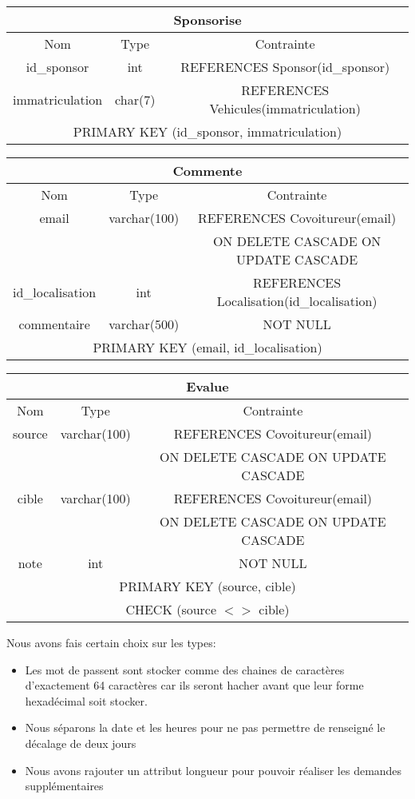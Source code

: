 \begin{center}
		\begin{tabular}{|c|c|c|}
			\hline
			\multicolumn{3}{|c|}{Sponsorise}\\
			\hline
			Nom & Type & Contrainte \\
			\hline
			id\_sponsor & int & REFERENCES Sponsor(id\_sponsor)\\\hline
			immatriculation & char(7) & REFERENCES Vehicules(immatriculation) \\\hline
			\multicolumn{3}{|c|}{PRIMARY KEY (id\_sponsor, immatriculation)}\\\hline
		\end{tabular}
		
		\begin{tabular}{|c|c|c|}
			\hline
			\multicolumn{3}{|c|}{Commente}\\
			\hline
			Nom & Type & Contrainte \\
			\hline
			email & varchar(100) & REFERENCES Covoitureur(email) \\
			& & ON DELETE CASCADE ON UPDATE CASCADE \\\hline
			id\_localisation & int & REFERENCES Localisation(id\_localisation) \\\hline
			commentaire & varchar(500) & NOT NULL \\\hline
			\multicolumn{3}{|c|}{PRIMARY KEY (email, id\_localisation)}\\\hline
		\end{tabular}
		
		\begin{tabular}{|c|c|c|}
			\hline
			\multicolumn{3}{|c|}{Evalue}\\
			\hline
			Nom & Type & Contrainte \\
			\hline
			source & varchar(100) & REFERENCES Covoitureur(email)  \\
			& & ON DELETE CASCADE ON UPDATE CASCADE\\\hline
			cible & varchar(100) & REFERENCES Covoitureur(email)  \\
			& & ON DELETE CASCADE ON UPDATE CASCADE\\\hline
			note & int & NOT NULL \\\hline
			\multicolumn{3}{|c|}{PRIMARY KEY (source, cible)}\\\hline
			\multicolumn{3}{|c|}{CHECK (source  $< >$ cible)}\\\hline
		\end{tabular}
	\end{center}
	Nous avons fais certain choix sur les types:
	\begin{itemize}
		\item Les mot de passent sont stocker comme des chaines de caractères d'exactement 64 caractères car ils seront hacher avant que leur forme hexadécimal soit stocker.
		\item  Nous séparons la date et les heures pour ne pas permettre de renseigné le décalage de deux jours
		\item Nous avons rajouter un attribut longueur pour pouvoir réaliser les demandes supplémentaires
	\end{itemize}

